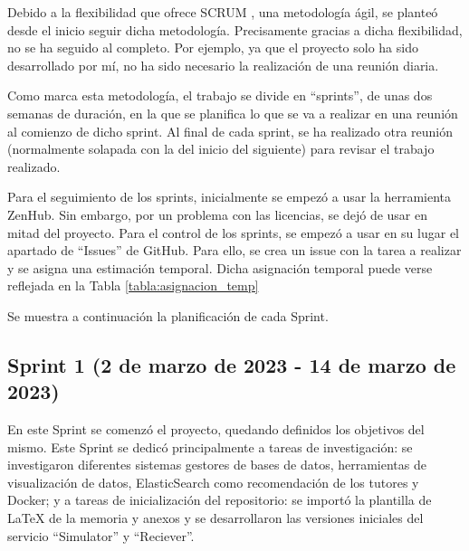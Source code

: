 Debido a la flexibilidad que ofrece SCRUM \cite{schwaber2001agile}, una metodología ágil, se planteó desde el inicio seguir dicha 
metodología. Precisamente gracias a dicha flexibilidad, no se ha seguido al completo. Por ejemplo, ya que 
el proyecto solo ha sido desarrollado por mí, no ha sido necesario la realización de una reunión diaria.

Como marca esta metodología, el trabajo se divide en ``sprints'', de unas dos semanas de duración, en la que 
se planifica lo que se va a realizar en una reunión al comienzo de dicho sprint. Al final de cada sprint, se
ha realizado otra reunión (normalmente solapada con la del inicio del siguiente) para revisar el trabajo realizado.

Para el seguimiento de los sprints, inicialmente se empezó a usar la herramienta ZenHub. Sin embargo, por un problema
con las licencias, se dejó de usar en mitad del proyecto. Para el control de los sprints, se empezó a usar en su 
lugar el apartado de ``Issues'' de GitHub. Para ello, se crea un issue con la tarea a realizar y se asigna una estimación 
temporal. Dicha asignación temporal puede verse reflejada en la Tabla \ref{tabla:asignacion_temp}


Se muestra a continuación la planificación de cada Sprint.

\subsection{Sprint 1 (2 de marzo de 2023 - 14 de marzo de 2023)}

En este Sprint se comenzó el proyecto, quedando definidos los objetivos del mismo. Este Sprint se dedicó principalmente 
a tareas de investigación: se investigaron diferentes sistemas gestores de bases de datos, herramientas de visualización 
de datos, ElasticSearch como recomendación de los tutores y Docker; y a tareas de inicialización del repositorio: se 
importó la plantilla de LaTeX de la memoria y anexos y se desarrollaron las versiones iniciales del servicio ``Simulator'' y 
``Reciever''.

